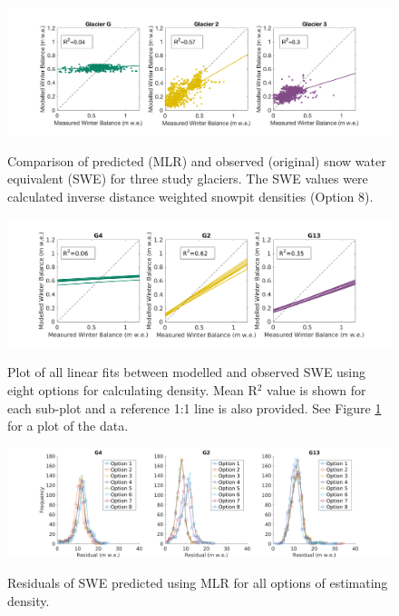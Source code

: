 \documentclass[12pt]{article}
\begin{document}
\begin{landscape}
\begin{figure}
	\centering
	\includegraphics[height = 0.4\textwidth]{MLRfit_opt8.png}\\
	\caption{Comparison of predicted (MLR) and observed (original) snow water equivalent (SWE) for three study glaciers. The SWE values were calculated inverse distance weighted snowpit densities (Option 8).}
	\label{fig:MLRfit_opt8}
\end{figure}

\pagebreak

\begin{figure}
	\centering
	\includegraphics[height = 0.4\textwidth]{MLRfit_allLines.png}\\
	\caption{Plot of all linear fits between modelled and observed SWE using eight options for calculating density. Mean R$^2$ value is shown for each sub-plot and a reference 1:1 line is also provided. See Figure \ref{fig:MLRfit_opt8} for a plot of the data. }
	\label{fig:MLRfit_allLines}
\end{figure}

\begin{figure}
	\centering
	\includegraphics[height = 0.4\textwidth]{MLRresiduals_all.png}\\
	\caption{Residuals of SWE predicted using MLR for all options of estimating density.}
	\label{fig:MLRresiduals_all}
\end{figure}

\end{landscape}
 
\end{document}
